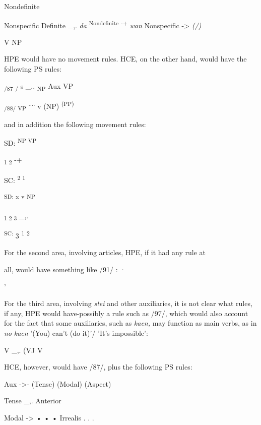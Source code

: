 \ea\label{ex:95}

\glt
\z

\ea\label{ex:96}

\glt
\z

Nondefinite

Nonspecific Definite \_,. \textit{da} \textsuperscript{Nondefinite }\textsuperscript{{}-+ }\textit{wan} Nonspecific {}-{\textgreater} \textit{(/)}

V NP

HPE would have no movement rules. HCE, on the other hand, would have the following PS rules:

\textsubscript{/87}\textsubscript{ }\textsubscript{/ }s \_,. \textsubscript{NP }Aux VP

\textsubscript{/88/ VP}\textsubscript{ }\textsuperscript{.... }v (NP) \textsuperscript{(PP)}

and in addition the following movement rules:

\ea\label{ex:89}
SD: \textsuperscript{NP VP}
\glt
\z

\textsubscript{1 2 }{}-+

SC: \textsuperscript{2 1}

\ea\label{ex:90}
\textsuperscript{SD: }\textsuperscript{x }\textsuperscript{v }\textsuperscript{NP}
\glt
\z

\textsubscript{1 2 3 }\_,.

\textsuperscript{SC: }3 \textsuperscript{1 }\textsuperscript{2}

For the second area, involving articles, HPE, if it had any rule at

all, would have something like /91/ : ·

'

For the third area, involving \textit{stei} and other auxiliaries, it is not clear what rules, if any, HPE would have-possibly a rule such as /97/, which would also account for the fact that some auxiliaries, such as \textit{kaen,} may function as main verbs, as in \textit{no} \textit{kaen} '(You) can't (do it)'/ 'It's impossible':

\ea\label{ex:97}
V \_,. (VJ V
\glt
\z

HCE, however, would have /87/, plus the following PS rules:

\ea\label{ex:98}
Aux {}-{\textgreater}- (Tense) (Modal) (Aspect)
\glt
\z

\ea\label{ex:99}
Tense \_,. Anterior
\glt
\z

\ea\label{ex:100}
Modal {}-{\textgreater} • • • Irrealis . . .
\glt
\z


